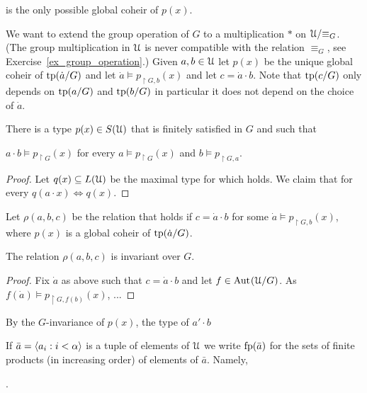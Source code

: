 \documentclass[creche.tex]{subfiles}
\begin{document}

is the only possible global coheir of $p(x)$.


We want to extend the group operation of $G$ to a multiplication $*$ on $\EuScript U/{\equiv_G}$. (The group multiplication in $\EuScript U$ is never compatible with the relation $\equiv_G$, see Exercise~\ref{ex_group_operation}.) Given $a,b\in\EuScript U$ let $p(x)$ be the unique global coheir of ${\rm tp}(\dot a/G)$ and let $\dot a\models p_{\restriction G,b}(x)$ and let $c=\dot a\cdot b$. Note that ${\rm tp}(c/G)$ only depends on ${\rm tp}(a/G)$ and ${\rm tp}(b/G)$ in particular it does not depend on the choice of $\dot a$.

\begin{lemma}
There is a type $p(x)\in S(\EuScript U)$ that is finitely satisfied in $G$ and such that 

\ssf{\#}\quad $a\cdot b\models p_{\restriction G}(x)$ for every $a\models p_{\restriction G}(x)$ and $b\models p_{\restriction G,a}$. 
\end{lemma}

\begin{proof}
Let $q(x)\subseteq L(\EuScript U)$ be the maximal type for which \ssf{\#} holds. We claim that for every $q(a\cdot x)\iff q(x)$. 
\end{proof}


Let $\rho(a,b,c)$ be the relation that holds if $c=\dot a\cdot b$ for some $\dot a\models p_{\restriction G,b}(x)$, where $p(x)$ is a global coheir of ${\rm tp}(\dot a/G)$.


\begin{proposition}
The relation $\rho(a,b,c)$ is invariant over $G$.
\end{proposition}

\begin{proof}
Fix $\dot a$ as above such that $c=\dot a\cdot b$ and let $f\in\textrm{Aut\kern.15ex}(\EuScript U/G)$. As $f(\dot a)\models p_{\restriction G,f(b)}(x)$, ...
\end{proof}

By the $G$-invariance of $p(x)$, the type of $a'\cdot b$

\def\fp{{\rm fp}}

If $\bar a=\langle a_i:i<\alpha\rangle$ is a tuple of elements of $\EuScript U$ we write $\fp(\bar a)$ for the sets of finite products (in increasing order) of elements of $\bar a$. Namely,

\ceq{\hfill\emph{$\fp(\bar a)$}}{=}{\Big\{a_{i_1}\cdot\dots\cdot a_{i_n}\ :\quad i_0<\dots<i_{n-1}<\alpha,\ \  n\in\omega\Big\}}.
\end{document}
